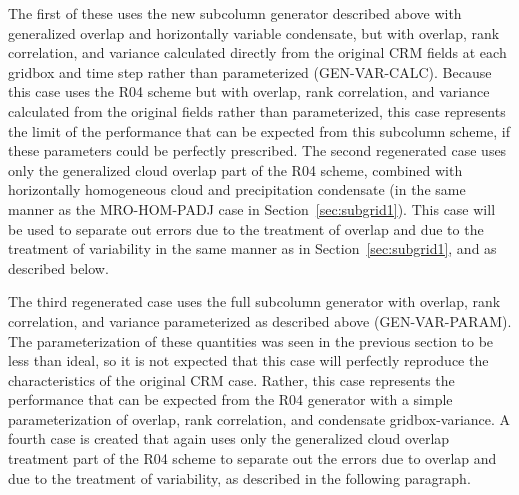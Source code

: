 The first of these uses the new subcolumn generator described above with
generalized overlap and horizontally variable condensate, but with
overlap, rank correlation, and variance calculated directly from the
original CRM fields at each gridbox and time step rather than
parameterized (GEN-VAR-CALC). Because this case uses the R04 scheme but
with overlap, rank correlation, and variance calculated from the
original fields rather than parameterized, this case represents the
limit of the performance that can be expected from this subcolumn
scheme, if these parameters could be perfectly prescribed. The second
regenerated case uses only the generalized cloud overlap part of the R04
scheme, combined with horizontally homogeneous cloud and precipitation
condensate (in the same manner as the MRO-HOM-PADJ case in
Section~\ref{sec:subgrid1}). This case will be used to separate out
errors due to the treatment of overlap and due to the treatment of
variability in the same manner as in Section~\ref{sec:subgrid1}, and as
described below.

The third regenerated case uses the full subcolumn generator with
overlap, rank correlation, and variance parameterized as described above
(GEN-VAR-PARAM). The parameterization of these quantities was seen in
the previous section to be less than ideal, so it is not expected that
this case will perfectly reproduce the characteristics of the original
CRM case. Rather, this case represents the performance that can be
expected from the R04 generator with a simple parameterization of
overlap, rank correlation, and condensate gridbox-variance. A fourth
case is created that again uses only the generalized cloud overlap
treatment part of the R04 scheme to separate out the errors due to
overlap and due to the treatment of variability, as described in the
following paragraph.

